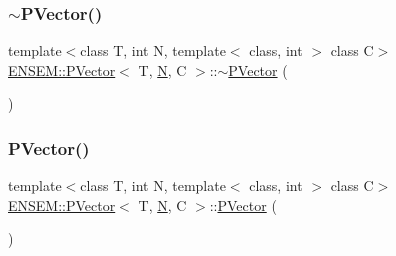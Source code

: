 \subsubsection{\texorpdfstring{$\sim$PVector()}{~PVector()}\hspace{0.1cm}{\footnotesize\ttfamily [2/3]}}
{\footnotesize\ttfamily template$<$class T, int N, template$<$ class, int $>$ class C$>$ \\
\mbox{\hyperlink{classENSEM_1_1PVector}{E\+N\+S\+E\+M\+::\+P\+Vector}}$<$ T, \mbox{\hyperlink{adat__devel_2lib_2hadron_2operator__name__util_8cc_a7722c8ecbb62d99aee7ce68b1752f337}{N}}, C $>$\+::$\sim$\mbox{\hyperlink{classENSEM_1_1PVector}{P\+Vector}} (\begin{DoxyParamCaption}{ }\end{DoxyParamCaption})\hspace{0.3cm}{\ttfamily [inline]}}

\mbox{\label{classENSEM_1_1PVector_afc5f971e6ec88789c8205b2e03b1edfd}} 
\subsubsection{\texorpdfstring{PVector()}{PVector()}\hspace{0.1cm}{\footnotesize\ttfamily [3/3]}}
{\footnotesize\ttfamily template$<$class T, int N, template$<$ class, int $>$ class C$>$ \\
\mbox{\hyperlink{classENSEM_1_1PVector}{E\+N\+S\+E\+M\+::\+P\+Vector}}$<$ T, \mbox{\hyperlink{adat__devel_2lib_2hadron_2operator__name__util_8cc_a7722c8ecbb62d99aee7ce68b1752f337}{N}}, C $>$\+::\mbox{\hyperlink{classENSEM_1_1PVector}{P\+Vector}} (\begin{DoxyParamCaption}{ }\end{DoxyParamCaption})\hspace{0.3cm}{\ttfamily [inline]}}

\mbox{\label{classENSEM_1_1PVector_a74ba2f55760e8ed1947ef3bb534400b6}} 
